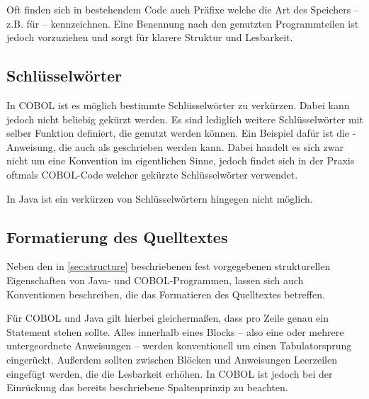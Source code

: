 Oft finden sich in bestehendem Code auch Präfixe welche die Art des Speichers -- z.B.  für  -- kennzeichnen. Eine Benennung nach den genutzten Programmteilen ist jedoch vorzuziehen und sorgt für klarere Struktur und Lesbarkeit.


\subsection*{Schlüsselwörter}
In COBOL ist es möglich bestimmte Schlüsselwörter zu verkürzen. Dabei kann jedoch nicht beliebig gekürzt werden. Es sind lediglich weitere Schlüsselwörter mit selber Funktion definiert, die genutzt werden können. Ein Beispiel dafür ist die -Anweisung, die auch als  geschrieben werden kann. Dabei handelt es sich zwar nicht um eine Konvention im eigentlichen Sinne, jedoch findet sich in der Praxis oftmals COBOL-Code welcher gekürzte Schlüsselwörter verwendet.

In Java ist ein verkürzen von Schlüsselwörtern hingegen nicht möglich.

\subsection*{Formatierung des Quelltextes}

Neben den in \autoref{sec:structure} beschriebenen fest vorgegebenen strukturellen Eigenschaften von Java- und COBOL-Programmen, lassen sich auch Konventionen beschreiben, die das Formatieren des Quelltextes betreffen.

Für COBOL und Java gilt hierbei gleichermaßen, dass pro Zeile genau ein Statement stehen sollte. Alles innerhalb eines Blocks -- also eine oder mehrere untergeordnete Anweisungen -- werden konventionell um einen Tabulatorsprung eingerückt. Außerdem sollten zwischen Blöcken und Anweisungen Leerzeilen eingefügt werden, die die Lesbarkeit erhöhen. In COBOL ist jedoch bei der Einrückung das bereits beschriebene Spaltenprinzip zu beachten.